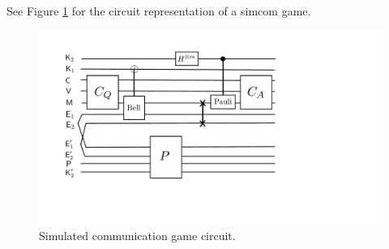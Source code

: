 




\noindent See Figure \ref{fig:simcom} for the circuit representation of a simcom game.

\begin{figure}[H]
\begin{center}
\includegraphics[width=4.5in]{graphics/simcom.pdf}
\end{center}
\caption{Simulated communication game circuit.}
\label{fig:simcom}
\end{figure}

